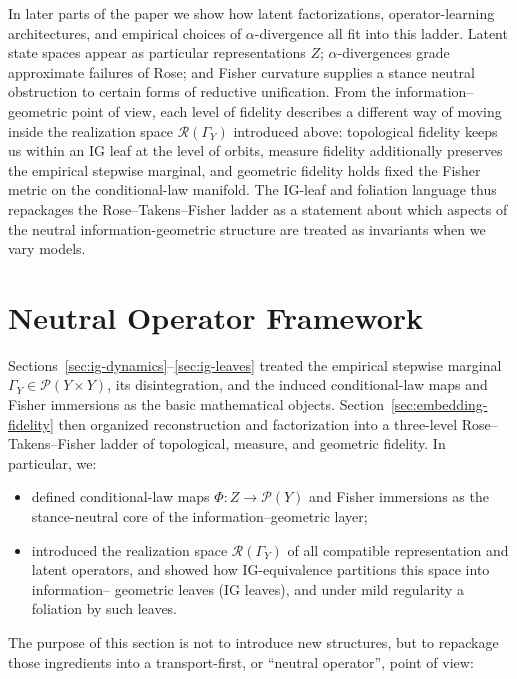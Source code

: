 \documentclass[11pt]{article}
\newcommand{\1}{\mathbf{1}}
\begin{document}
In later parts of the paper we show how latent factorizations, operator-learning architectures, and empirical choices of $\alpha$-divergence all fit into this ladder. Latent state spaces appear as particular representations $Z$; $\alpha$-divergences grade approximate failures of Rose; and Fisher curvature supplies a stance neutral obstruction to certain forms of reductive unification. From the information--geometric point of view, each level of fidelity describes a different way of moving inside the realization space $\mathcal{R}(\Gamma_Y)$ introduced above: topological fidelity keeps us within an IG leaf at the level of orbits, measure fidelity additionally preserves the empirical stepwise marginal, and geometric fidelity holds fixed the Fisher metric on the conditional-law manifold. The IG-leaf and foliation language thus repackages the Rose--Takens--Fisher ladder as a statement about which aspects of the neutral information-geometric structure are treated as invariants when we vary models.

\newpage


\section{Neutral Operator Framework}
\label{sec:neutral-operator}

Sections~\ref{sec:ig-dynamics}--\ref{sec:ig-leaves} treated the empirical stepwise marginal $\Gamma_Y \in \mathcal P(Y\times Y)$, its disintegration, and the induced conditional-law maps and Fisher immersions as the basic mathematical objects. Section~\ref{sec:embedding-fidelity} then organized reconstruction and factorization into a three-level Rose--Takens--Fisher ladder of topological, measure, and geometric fidelity. In particular, we:
\begin{itemize}[leftmargin=1.5em]
  \item defined conditional-law maps $\Phi : Z\to\mathcal P(Y)$ and Fisher immersions as the
  stance-neutral core of the information--geometric layer;
  \item introduced the realization space $\mathcal R(\Gamma_Y)$ of all compatible representation
  and latent operators, and showed how IG-equivalence partitions this space into information--
  geometric leaves (IG leaves), and under mild regularity a foliation by such leaves.
\end{itemize}
The purpose of this section is not to introduce new structures, but to repackage those ingredients into a transport-first, or ``neutral operator'', point of view:
\end{document}
